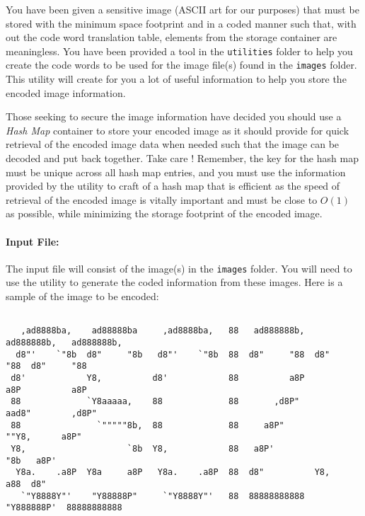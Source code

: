 \documentclass[10pt]{article}
\begin{document}
You have been given a sensitive image (ASCII art for our purposes) that must be stored with the minimum space footprint and in a coded manner such that, with out the code word translation table, elements from the storage container are meaningless. You have been provided a tool in the \verb|utilities| folder to help you create the code words to be used for the image file(s) found in the \verb|images| folder. This utility will create for you a lot of useful information to help you store the encoded image information. 

Those seeking to secure the image information have decided you should use a \emph{Hash Map} container to store your encoded image as it should provide for quick retrieval of the encoded image data when needed such that the image can be decoded and put back together. Take care ! Remember, the key for the hash map must be unique across all hash map entries, and you must use the information provided by the utility to craft of a hash map that is efficient as the speed of retrieval of the encoded image is vitally important and must be close to $O(1)$ as possible, while minimizing the storage footprint of the encoded image.

\paragraph{Input File:} The input file will consist of the image(s) in the \verb|images| folder. You will need to use the utility to generate the coded information from these images. Here is a sample of the image to be encoded:
\begin{verbatim}
                                                                                        
   ,ad8888ba,    ad88888ba     ,ad8888ba,   88   ad888888b,   ad888888b,   ad888888b,  
  d8"'    `"8b  d8"     "8b   d8"'    `"8b  88  d8"     "88  d8"     "88  d8"     "88  
 d8'            Y8,          d8'            88          a8P          a8P          a8P  
 88             `Y8aaaaa,    88             88       ,d8P"        aad8"        ,d8P"   
 88               `"""""8b,  88             88     a8P"           ""Y8,      a8P"      
 Y8,                    `8b  Y8,            88   a8P'                "8b   a8P'        
  Y8a.    .a8P  Y8a     a8P   Y8a.    .a8P  88  d8"          Y8,     a88  d8"          
   `"Y8888Y"'    "Y88888P"     `"Y8888Y"'   88  88888888888   "Y888888P'  88888888888  
                                                                                       
\end{verbatim}
\end{document}
